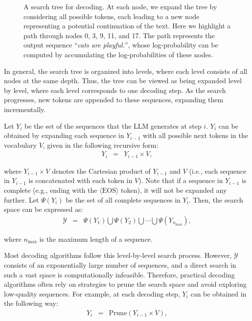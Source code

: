 \begin{figure}[!t]
\centering

\vspace{-0.5cm} \caption{A search tree for decoding. At each node, we expand the tree by considering all possible tokens, each leading to a new node representing a potential continuation of the text. Here we highlight a path through nodes 0, 3, 9, 11, and 17. The path represents the output sequence ``\textit{cats are playful.}'', whose log-probability can be computed by accumulating the log-probabilities of these nodes.}
\label{fig:llm-decoding-search-tree}
\end{figure}

In general, the search tree is organized into levels, where each level consists of all nodes at the same depth. Thus, the tree can be viewed as being expanded level by level, where each level corresponds to one decoding step. As the search progresses, new tokens are appended to these sequences, expanding them incrementally.

Let $Y_i$ be the set of the sequences that the LLM generates at step $i$. $Y_i$ can be obtained by expanding each sequence in $Y_{i-1}$ with all possible next tokens in the vocabulary $V$, given in the following recursive form:
\begin{eqnarray}
Y_i & = & Y_{i-1} \times V,
\end{eqnarray}

\noindent where $Y_{i-1} \times V$ denotes the Cartesian product of $Y_{i-1}$ and $V$ (i.e., each sequence in $Y_{i-1}$ is concatenated with each token in $V$). Note that if a sequence in $Y_{i-1}$ is complete (e.g., ending with the $\langle \mathrm{EOS} \rangle$ token), it will not be expanded any further. Let $\Psi(Y_i)$ be the set of all complete sequences in $Y_i$. Then, the search space can be expressed as:
\begin{eqnarray}
\mathcal{Y} & = & \Psi(Y_1) \bigcup \Psi(Y_2) \bigcup \cdots \bigcup \Psi(Y_{n_{\mathrm{max}}}),
\end{eqnarray}

\noindent where $n_{\mathrm{max}}$ is the maximum length of a sequence.

Most decoding algorithms follow this level-by-level search process. However, $\mathcal{Y}$ consists of an exponentially large number of sequences, and a direct search
in such a vast space is computationally infeasible. Therefore, practical decoding algorithms often rely on strategies to prune the search space and avoid exploring low-quality sequences. For example, at each decoding step, $Y_i$ can be obtained in the following way:
\begin{eqnarray}
Y_i & = & \mathrm{Prune}(Y_{i-1} \times V),
\end{eqnarray}

